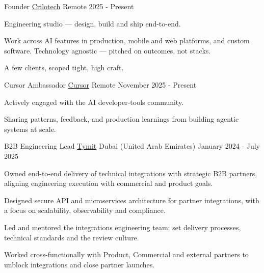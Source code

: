 \begin{cventries}
  \cventry
    {Founder} %
    {\href{https://crilotech.com}{Crilotech}} %
    {Remote} %
    {2025 - Present} %
    {
      \begin{cvitems} %
        \item[] Engineering studio — design, build and ship end-to-end.
        \item[] Work across AI features in production, mobile and web platforms, and custom software. Technology agnostic — pitched on outcomes, not stacks.
        \item[] A few clients, scoped tight, high craft.
      \end{cvitems}
    }

  \cventry
    {Cursor Ambassador} %
    {\href{https://cursor.com}{Cursor}} %
    {Remote} %
    {November 2025 - Present} %
    {
      \begin{cvitems} %
        \item[] Actively engaged with the AI developer-tools community.
        \item[] Sharing patterns, feedback, and production learnings from building agentic systems at scale.
      \end{cvitems}
    }

  \cventry
    {B2B Engineering Lead} %
    {\href{https://tymit.com}{Tymit}} %
    {Dubai (United Arab Emirates)} %
    {January 2024 - July 2025} %
    {
      \begin{cvitems} %
        \item[] Owned end-to-end delivery of technical integrations with strategic B2B partners, aligning engineering execution with commercial and product goals.
        \item[]
        \item[] Designed secure API and microservices architecture for partner integrations, with a focus on scalability, observability and compliance.
        \item[]
        \item[] Led and mentored the integrations engineering team; set delivery processes, technical standards and the review culture.
        \item[]
        \item[] Worked cross-functionally with Product, Commercial and external partners to unblock integrations and close partner launches.
      \end{cvitems}
    }


\end{cventries}
